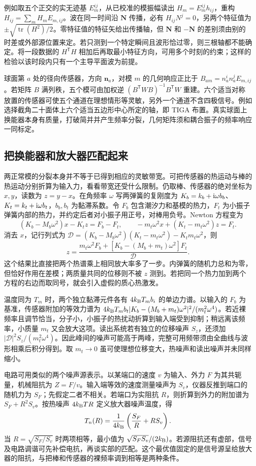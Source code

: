 例如取五个正交的实无迹基 $E_m^{ij}$，从已校准的模振幅读出 $H_m=E_m^{ij}h_{ij}$，重构 $H_{ij}=\sum_m H_mE_{m,ij}$。波在同一时间沿 $\bm N$ 传播，必有 $H_{ij}N^j=0$，另两个特征值为 $\pm\sqrt{\operatorname{tr}(H^2)/2}$。零特征值的特征矢给出传播轴，但 $\bm N$ 和 $-\bm N$ 的差别须由别的时差或外部源位置来定。若只测到一个特定瞬间且波形恰过零，则三根轴都不能确定。将一段数据的 $H^{\mathsf T}H$ 相加后再取最小特征方向，可用多个时刻的约束；这样的检验以该时段内只有一个主导平面波为前提。

球面第 $a$ 处的径向传感器，方向 $\bm n_a$，对模 $m$ 的几何响应正比于 $B_{am}=n_a^i n_a^j E_{m,ij}$。若矩阵 $B$ 满列秩，五个模可由加权逆 $(B^{\mathsf T}W B)^{-1}B^{\mathsf T}W$ 重建。六个适当对称放置的传感器可使五个通道在理想情形等灵敏，另外一个通道不含四极信号。例如选择截角二十面体上六个适当五边形中心所定的轴，即 TIGA 布置。真实球面上换能器本身有质量，打破简并并产生频率分裂，几何矩阵须和耦合振子的频率响应一同标定。

\subsection{把换能器和放大器匹配起来}
两正常模的分裂本身并不等于已得到相应的灵敏带宽。可把传感器的热运动与棒的热运动分别折算为输入力，看看带宽还受什么限制。仍取棒、传感器的绝对坐标为 $x,y$，读数为 $z=y-x$。在角频率 $\omega$ 写两弹簧的复刚度为 $K_b=k_b+\mathrm{i}\omega b_b$、$K_t=k_t+\mathrm{i}\omega b_t$，$b_b,b_t$ 为黏滞系数。令 $F_b$ 包含潮汐力和基模的热力，$F_t$ 为小振子弹簧内部的热力，并约定后者对小振子用正号，对棒用负号。Newton 方程变为
\[
 (K_b-M_b\omega^2)x-K_t z=F_b-F_t,\qquad
 -m_t\omega^2x+(K_t-m_t\omega^2)z=F_t .
\]
消去 $x$，记行列式为 $\mathcal D=(K_b-M_b\omega^2)(K_t-m_t\omega^2)-K_t m_t\omega^2$，则
\[
 z=\frac{m_t\omega^2 F_b+[K_b-(M_b+m_t)\omega^2]F_t}{\mathcal D}.
\]
这个结果比直接把两个热谱乘上相同放大率多了一步。内弹簧的随机力总和为零，但恰好作用在差模；两质量共同的位移则不被 $z$ 测到。若把同一个热力加到两个方程的右边而取同号，就会引入虚假的质心热激发。

温度同为 $T_m$ 时，两个独立黏滞元件各有 $4k_{\rm B}T_m b_i$ 的单边力谱。以输入的 $F_b$ 为基准，传感器附加的等效力谱为 $4k_{\rm B}T_m b_t|K_b-(M_b+m_t)\omega^2|^2/(m_t^2\omega^4)$。若近裸频率且调节恰当，分子小，小振子的热扰动折算到输入端受到抑制；稍远离该频率，小质量 $m_t$ 又会放大这项。读出系统若有独立的位移噪声 $S_z$，还须加 $|\mathcal D|^2 S_z/(m_t^2\omega^4)$。因此峰间的噪声可能高于两峰，完整可用频带须由全曲线与波形相乘后积分得到。取 $m_t\to0$ 虽可使理想位移变大，热噪声和读出噪声并未同样缩小。

电路可用类似的两个噪声源表示。以某端口的速度 $v$ 为输入、外力 $F$ 为其共轭量，机械阻抗为 $Z=F/v$。输入端等效的速度测量噪声为 $S_v$，仪器反推到端口的随机力为 $S_F$；先假定二者不相关。若端口为实阻抗 $R$，则折算到外力的附加谱为 $S_F+R^2S_v$。按热噪声 $4k_{\rm B}TR$ 定义放大器噪声温度，得
\[
 T_n(R)=\frac{1}{4k_{\rm B}}\left(\frac{S_F}{R}+RS_v\right).
\]
当 $R=\sqrt{S_F/S_v}$ 时两项相等，最小值为 $\sqrt{S_FS_v}/(2k_{\rm B})$。若源阻抗还有虚部，信号及电路调谐可先补偿电抗，再谈实部的匹配。这个最优值固定的是信号源呈给放大器的阻抗，与把棒和传感器的裸频率调到相等是两种条件。

